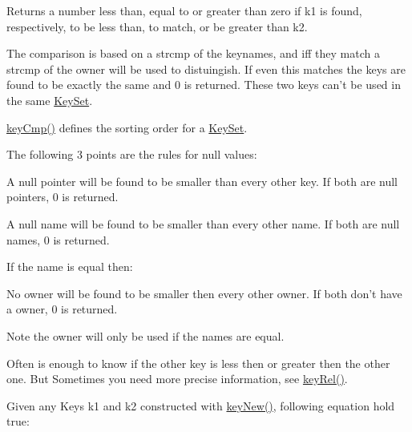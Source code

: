 \begin{DoxyReturn}{Returns}
a number less than, equal to or greater than zero if k1 is found, respectively, to be less than, to match, or be greater than k2.
\end{DoxyReturn}
The comparison is based on a strcmp of the keynames, and iff they match a strcmp of the owner will be used to distuingish. If even this matches the keys are found to be exactly the same and 0 is returned. These two keys can't be used in the same \hyperlink{classkdb_1_1KeySet}{Key\-Set}.

\hyperlink{group__keytest_gaf6e66e12fe04d535a5d1c8218ced803e}{key\-Cmp()} defines the sorting order for a \hyperlink{classkdb_1_1KeySet}{Key\-Set}.

The following 3 points are the rules for null values\-:


\begin{DoxyItemize}
\item A null pointer will be found to be smaller than every other key. If both are null pointers, 0 is returned.
\end{DoxyItemize}


\begin{DoxyItemize}
\item A null name will be found to be smaller than every other name. If both are null names, 0 is returned.
\end{DoxyItemize}

If the name is equal then\-:


\begin{DoxyItemize}
\item No owner will be found to be smaller then every other owner. If both don't have a owner, 0 is returned.
\end{DoxyItemize}

\begin{DoxyNote}{Note}
the owner will only be used if the names are equal.
\end{DoxyNote}
Often is enough to know if the other key is less then or greater then the other one. But Sometimes you need more precise information, see \hyperlink{group__keytest_ga6bb0f95ac34ce9c42d61bb35a76139d0}{key\-Rel()}.

Given any Keys k1 and k2 constructed with \hyperlink{group__key_gad23c65b44bf48d773759e1f9a4d43b89}{key\-New()}, following equation hold true\-:


